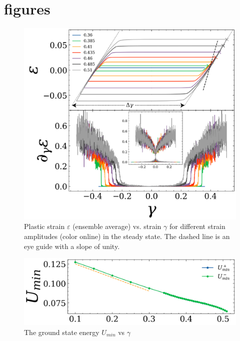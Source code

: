 \documentclass[%
 prl,
 amsmath,amssymb,
%
 reprint,%
]{revtex4-1}
\begin{document}
\section{figures}

\begin{figure}[h!]
\includegraphics[width = 1.\columnwidth]{fig_epsilon_vs_Gamma.png}%
\caption{Plastic strain $\varepsilon$ (ensemble average) vs. strain $\gamma$ for different strain amplitudes (color online) in the steady state. The dashed line is an eye guide with a slope of unity.}
\end{figure}

\begin{figure}[h!]
\includegraphics[width = 1.\columnwidth]{fig_Umin.png}%
\caption{The ground state energy $U_{min}$ vs $\gamma$ }
\end{figure}
\end{document}
